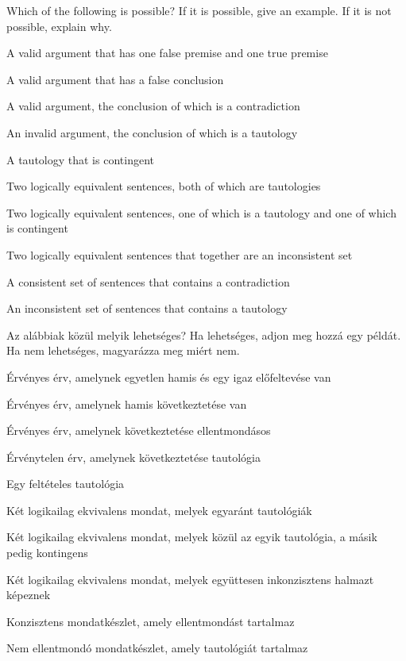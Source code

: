 \solutions
\problempart
\label{pr.EnglishCombinations}
Which of the following is possible? If it is possible, give an example. If it is not possible, explain why.
\begin{earg}
\item A valid argument that has one false premise and one true premise
\item A valid argument that has a false conclusion
\item A valid argument, the conclusion of which is a contradiction
\item An invalid argument, the conclusion of which is a tautology
\item A tautology that is contingent
\item Two logically equivalent sentences, both of which are tautologies
\item Two logically equivalent sentences, one of which is a tautology and one of which is contingent
\item Two logically equivalent sentences that together are an inconsistent set
\item A consistent set of sentences that contains a contradiction
\item An inconsistent set of sentences that contains a tautology
\end{earg}

\solutions
\problempart
\label{pr.EnglishCombinations}
Az alábbiak közül melyik lehetséges? Ha lehetséges, adjon meg hozzá egy példát. Ha nem lehetséges, magyarázza meg miért nem.
\begin{earg}
\item Érvényes érv, amelynek egyetlen hamis és egy igaz előfeltevése van
\item Érvényes érv, amelynek hamis következtetése van
\item Érvényes érv, amelynek következtetése ellentmondásos
\item Érvénytelen érv, amelynek következtetése tautológia
\item Egy feltételes tautológia
\item Két logikailag ekvivalens mondat, melyek egyaránt tautológiák
\item Két logikailag ekvivalens mondat, melyek közül az egyik tautológia, a másik pedig kontingens
\item Két logikailag ekvivalens mondat, melyek együttesen inkonzisztens halmazt képeznek
\item Konzisztens mondatkészlet, amely ellentmondást tartalmaz
\item Nem ellentmondó mondatkészlet, amely tautológiát tartalmaz
\end{earg}

